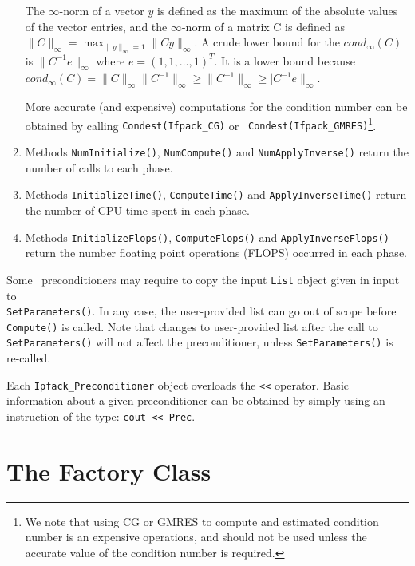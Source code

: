 \begin{enumerate}
The $\infty$-norm of a vector $y$ is defined as the maximum of the
absolute values of the vector entries, and the $\infty$-norm of a
matrix C is defined as
$\|C\|_\infty = \max_{\|y\|_\infty = 1} \|Cy\|_\infty$.
A crude lower bound for the $cond_\infty(C)$ is
$\|C^{-1}e\|_\infty$ where $e = (1, 1, \ldots, 1)^T$.  It is a
lower bound because $cond_\infty(C) = \|C\|_\infty\|C^{-1}\|_\infty
\ge \|C^{-1}\|_\infty \ge |C^{-1}e\|_\infty$. 

More accurate (and expensive) computations for the condition number can be
obtained by calling {\tt Condest(Ifpack\_CG)} or {\tt
  Condest(Ifpack\_GMRES)}\footnote{We note that using CG or GMRES to compute
and estimated condition number is an expensive operations, and should not
be used unless the accurate value of the condition number is required.}.
%
\item Methods \verb!NumInitialize()!, \verb!NumCompute()! and
\verb!NumApplyInverse()! return the number of calls to each phase.
%
\item Methods \verb!InitializeTime()!, \verb!ComputeTime()! and
\verb!ApplyInverseTime()! return the number of CPU-time spent in each phase.
%
\item Methods \verb!InitializeFlops()!, \verb!ComputeFlops()! and
\verb!ApplyInverseFlops()! return the number floating point operations (FLOPS)
  occurred in each phase.
\end{enumerate}


\begin{remark}
Some \ifpack\ preconditioners may require to copy the input \verb!List! object
given in input to \\ \verb!SetParameters()!. In any case, the
user-provided list can go out of scope before \verb!Compute()! is called.
Note that changes to user-provided list after the call to
\verb!SetParameters()! will not affect the preconditioner,
  unless \verb!SetParameters()!  is re-called.
\end{remark}

\begin{remark}
Each \verb!Ipfack_Preconditioner! object overloads the \verb!<<! operator.
Basic information about a given preconditioner can be obtained by simply
using an instruction of the type: \verb!cout << Prec!.
\end{remark}

\section{The Factory Class}
\label{sec:factory}

